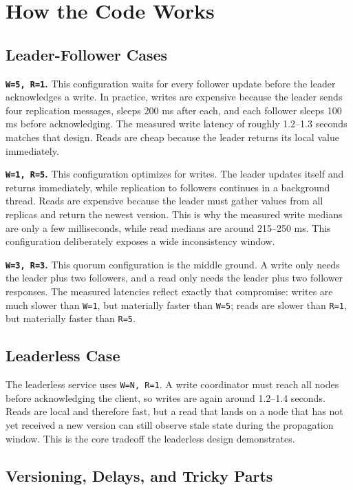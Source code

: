 \documentclass[11pt]{article}
\begin{document}
\section{How the Code Works}

\subsection*{Leader-Follower Cases}

\textbf{\texttt{W=5, R=1}.} This configuration waits for every follower update before the leader acknowledges a write. In practice, writes are expensive because the leader sends four replication messages, sleeps 200 ms after each, and each follower sleeps 100 ms before acknowledging. The measured write latency of roughly 1.2--1.3 seconds matches that design. Reads are cheap because the leader returns its local value immediately.

\textbf{\texttt{W=1, R=5}.} This configuration optimizes for writes. The leader updates itself and returns immediately, while replication to followers continues in a background thread. Reads are expensive because the leader must gather values from all replicas and return the newest version. This is why the measured write medians are only a few milliseconds, while read medians are around 215--250 ms. This configuration deliberately exposes a wide inconsistency window.

\textbf{\texttt{W=3, R=3}.} This quorum configuration is the middle ground. A write only needs the leader plus two followers, and a read only needs the leader plus two follower responses. The measured latencies reflect exactly that compromise: writes are much slower than \texttt{W=1}, but materially faster than \texttt{W=5}; reads are slower than \texttt{R=1}, but materially faster than \texttt{R=5}.

\subsection*{Leaderless Case}

The leaderless service uses \texttt{W=N, R=1}. A write coordinator must reach all nodes before acknowledging the client, so writes are again around 1.2--1.4 seconds. Reads are local and therefore fast, but a read that lands on a node that has not yet received a new version can still observe stale state during the propagation window. This is the core tradeoff the leaderless design demonstrates.

\subsection*{Versioning, Delays, and Tricky Parts}
\end{document}
